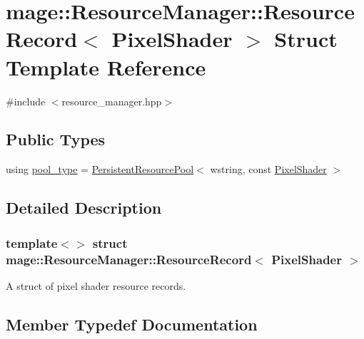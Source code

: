 \hypertarget{structmage_1_1_resource_manager_1_1_resource_record_3_01_pixel_shader_01_4}{}\section{mage\+:\+:Resource\+Manager\+:\+:Resource\+Record$<$ Pixel\+Shader $>$ Struct Template Reference}
\label{structmage_1_1_resource_manager_1_1_resource_record_3_01_pixel_shader_01_4}


{\ttfamily \#include $<$resource\+\_\+manager.\+hpp$>$}

\subsection*{Public Types}
\begin{DoxyCompactItemize}
\item 
using \hyperlink{structmage_1_1_resource_manager_1_1_resource_record_3_01_pixel_shader_01_4_abf3ea4911425542202c6f283c06ecc7e}{pool\+\_\+type} = \hyperlink{classmage_1_1_persistent_resource_pool}{Persistent\+Resource\+Pool}$<$ wstring, const \hyperlink{namespacemage_a27ecaf266420ee7a494d64edc0757129}{Pixel\+Shader} $>$
\end{DoxyCompactItemize}


\subsection{Detailed Description}
\subsubsection*{template$<$$>$\newline
struct mage\+::\+Resource\+Manager\+::\+Resource\+Record$<$ Pixel\+Shader $>$}

A struct of pixel shader resource records. 

\subsection{Member Typedef Documentation}
\hypertarget{structmage_1_1_resource_manager_1_1_resource_record_3_01_pixel_shader_01_4_abf3ea4911425542202c6f283c06ecc7e}{}\label{structmage_1_1_resource_manager_1_1_resource_record_3_01_pixel_shader_01_4_abf3ea4911425542202c6f283c06ecc7e} 
